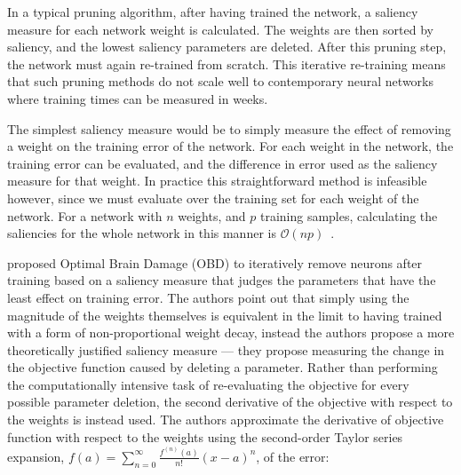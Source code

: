 \documentclass[thesis]{subfiles}
\begin{document}
    In a typical pruning algorithm, after having trained the network, a saliency measure for each network weight is calculated. The weights are then sorted by saliency, and the lowest saliency parameters are deleted. After this pruning step, the network must again re-trained from scratch. This iterative re-training means that such pruning methods do not scale well to contemporary neural networks where training times can be measured in weeks.

    The simplest saliency measure would be to simply measure the effect of removing a weight on the training error of the network. For each weight in the network, the training error can be evaluated, and the difference in error used as the saliency measure for that weight. In practice this straightforward method is infeasible however, since we must evaluate over the training set for each weight of the network. For a network with $n$ weights, and $p$ training samples, calculating the saliencies for the whole network in this manner is $\mathcal{O}(np)$~\citep{hanson1989comparing}.
    
    \citet{lecun1989optimal} proposed Optimal Brain Damage (OBD) to iteratively remove neurons after training based on a saliency measure that judges the parameters that have the least effect on training error. The authors point out that simply using the magnitude of the weights themselves is equivalent in the limit to having trained with a form of non-proportional weight decay, instead the authors propose a more theoretically justified saliency measure --- they propose measuring the change in the objective function caused by deleting a parameter. Rather than performing the computationally intensive task of re-evaluating the objective for every possible parameter deletion, the second derivative of the objective with respect to the weights is instead used. The authors approximate the derivative of objective function with respect to the weights using the second-order Taylor series expansion, $f(a) = \sum_{n=0}^\infty \frac{f^{(n)}(a)}{n!} (x - a)^n$, of the error:
       
\end{document}
